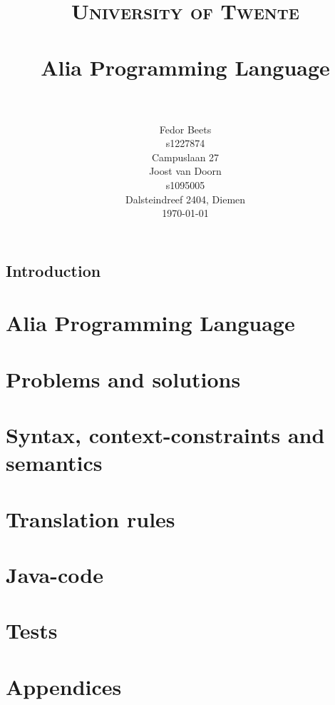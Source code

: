 \documentclass[paper=a4, fontsize=11pt]{report}
\title{
		\usefont{OT1}{bch}{b}{n}
		\normalfont \normalsize \textsc{University of Twente} \\ [25pt]
		\horrule{0.5pt} \\[0.4cm]
		\huge Alia Programming Language \\
		\horrule{2pt} \\[0.5cm]
}
\author{
		\normalfont 								\normalsize
        Fedor Beets\\[-3pt]						\small
        s1227874\\[-3pt]        				\small
        Campuslaan 27\\[8pt]					\normalsize
        Joost van Doorn\\[-3pt]					\small
        s1095005\\[-3pt]						\small
        Dalsteindreef 2404, Diemen\\[8pt]			\normalsize
        \today
}
\date{}
\numberwithin{equation}{section}		%
\numberwithin{figure}{section}			%
\numberwithin{table}{section}				%
\begin{document}
\maketitle
\section*{Introduction}


\chapter{Alia Programming Language}


\chapter{Problems and solutions}

\chapter{Syntax, context-constraints and semantics}


\chapter{Translation rules} %

\chapter{Java-code}
\chapter{Tests}

\chapter{Appendices}
% 
\end{document}
